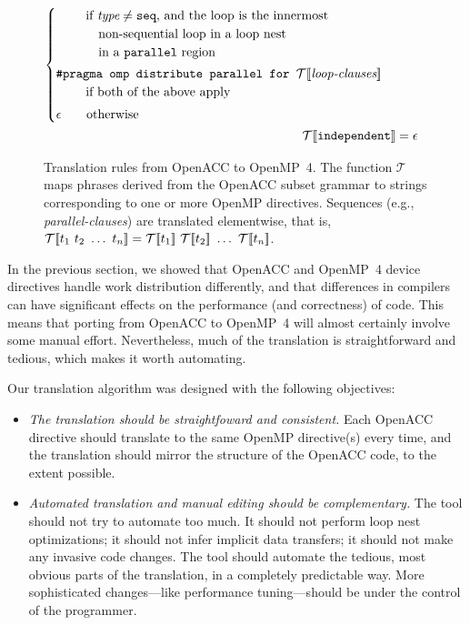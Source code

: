 \documentclass{sig-alternate-05-2015}
\begin{document}
\begin{figure*}
\begin{align*}
\begin{cases}
        \hspace*{2em} \textup{ if $\textit{type} \neq \texttt{seq}$, and the loop is the innermost} \\
        \hspace*{3em} \textup{ non-sequential loop in a loop nest} \\
        \hspace*{3em} \textup{ in a \texttt{parallel} region} \vspace*{.25em} \\
   \texttt{\#pragma omp distribute parallel for\ }\translate{\textit{loop-clauses}} \\
        \hspace*{2em} \textup{ if both of the above apply} \vspace*{.33em} \\
   \epsilon
        \hspace*{1.65em} \textup{ otherwise} \\
   \end{cases} \\
%
\translate{\texttt{independent}} &=
   \epsilon \\
%
\end{align*}
\caption{Translation rules from OpenACC to OpenMP~4.  The function
$\mathcal{T}$ maps phrases derived from the OpenACC subset grammar to
strings corresponding to one or more OpenMP directives.  Sequences
(e.g., \textit{parallel-clauses}) are translated elementwise, that is,
$\translate{t_1\ t_2\ \dots\ t_n} =
\translate{t_1}\ \translate{t_2}\ \dots\ \translate{t_n}$.}
\label{fig:rules}
\end{figure*}

In the previous section, we showed that OpenACC and OpenMP~4 device directives
handle work distribution differently, and that differences in compilers can
have significant effects on the performance (and correctness) of code.  This
means that porting from OpenACC to OpenMP~4 will almost certainly involve
some manual effort.  Nevertheless, much of the translation is straightforward
and tedious, which makes it worth automating.

Our translation algorithm was designed with the following objectives:
\begin{itemize}
\item \emph{The translation should be straightfoward and consistent.}
Each OpenACC directive should translate to the same OpenMP directive(s)
every time, and the translation should mirror the structure of the OpenACC
code, to the extent possible.
\item \emph{Automated translation and manual editing should be complementary.}
The tool should not try to automate too much.  It should not perform loop
nest optimizations; it should not infer implicit data transfers; it should
not make any invasive code changes.  The tool should automate the tedious,
most obvious parts of the translation, in a completely predictable way.
More sophisticated changes---like performance tuning---should be under the
control of the programmer.
\end{itemize}
\end{document}
